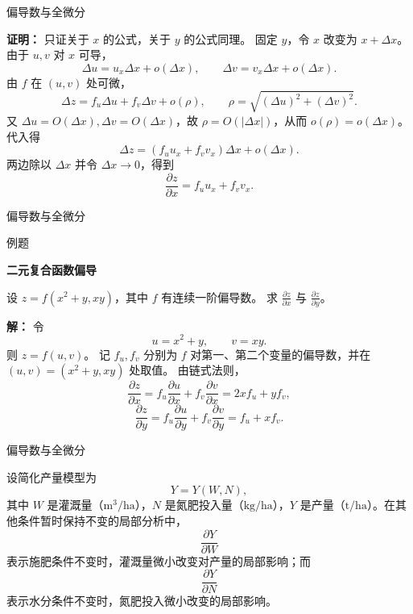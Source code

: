 \documentclass[aspectratio=169,10pt,fontset=fandol]{ctexbeamer}
\begin{document}
\begin{frame}[t,fragile]{偏导数与全微分}
\small
{\small
\textbf{证明：}
只证关于 $x$ 的公式，关于 $y$ 的公式同理。 固定 $y$，令 $x$ 改变为 $x+\Delta x$。 由于 $u,v$ 对 $x$ 可导，
\[
\Delta u=u_x\Delta x+o(\Delta x),\qquad
\Delta v=v_x\Delta x+o(\Delta x).
\]
由 $f$ 在 $(u,v)$ 处可微，
\[
\Delta z=f_u\Delta u+f_v\Delta v+o(\rho),
\qquad \rho=\sqrt{(\Delta u)^2+(\Delta v)^2}.
\]
又 $\Delta u=O(\Delta x),\Delta v=O(\Delta x)$，故 $\rho=O(|\Delta x|)$，从而 $o(\rho)=o(\Delta x)$。 代入得
\[
\Delta z=(f_u u_x+f_v v_x)\Delta x+o(\Delta x).
\]
两边除以 $\Delta x$ 并令 $\Delta x\to0$，得到
\[
\frac{\partial z}{\partial x}=f_u u_x+f_v v_x.
\]

}
\end{frame}
\begin{frame}[t,fragile]{偏导数与全微分}
\normalsize
\begin{block}{例题}
{\normalsize
\textbf{二元复合函数偏导}\par

设 $z=f(x^2+y,xy)$，其中 $f$ 有连续一阶偏导数。 求 $\frac{\partial z}{\partial x}$ 与 $\frac{\partial z}{\partial y}$。

}
\end{block}
\pause
{\normalsize
\textbf{解：}
令
\[
u=x^2+y,\qquad v=xy.
\]
则 $z=f(u,v)$。 记 $f_u,f_v$ 分别为 $f$ 对第一、第二个变量的偏导数，并在 $(u,v)=(x^2+y,xy)$ 处取值。 由链式法则，
\[
\frac{\partial z}{\partial x}
=f_u\frac{\partial u}{\partial x}+f_v\frac{\partial v}{\partial x}
=2x f_u+y f_v,
\]
\[
\frac{\partial z}{\partial y}
=f_u\frac{\partial u}{\partial y}+f_v\frac{\partial v}{\partial y}
=f_u+x f_v.
\]

}
\end{frame}
\begin{frame}[t,fragile]{偏导数与全微分}
\small
{\small
\begin{application}[作物产量对水分和氮肥的敏感性]
设简化产量模型为
\[
Y=Y(W,N),
\]
其中 $W$ 是灌溉量（$\mathrm{m^3/ha}$），$N$ 是氮肥投入量（$\mathrm{kg/ha}$），$Y$ 是产量（$\mathrm{t/ha}$）。在其他条件暂时保持不变的局部分析中，
\[
\frac{\partial Y}{\partial W}
\]
表示施肥条件不变时，灌溉量微小改变对产量的局部影响；而
\[
\frac{\partial Y}{\partial N}
\]
表示水分条件不变时，氮肥投入微小改变的局部影响。
\end{application}
}
\end{frame}
\end{document}
